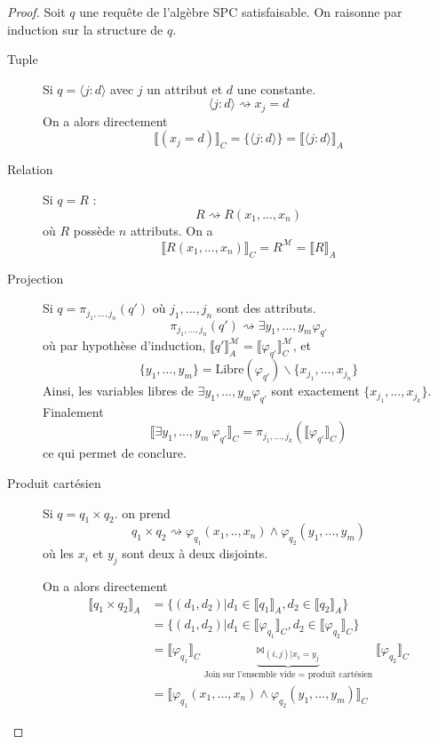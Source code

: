 \begin{proof}
Soit $q$ une requête de l'algèbre SPC satisfaisable. On raisonne par induction sur la structure de $q$.

\begin{description}
\item[Tuple] Si $q=\langle j : d\rangle$ avec $j$ un attribut et $d$ une constante.
$$
\langle j : d \rangle \rightsquigarrow x_j = d
$$
On a alors directement 
$$
\llbracket (x_j=d)\rrbracket_C = \{\langle j : d\rangle \} = \llbracket \langle j : d\rangle \rrbracket_A 
$$

\item[Relation] Si $q=R$ :
$$
R \rightsquigarrow R(x_1,...,x_n)
$$
où $R$ possède $n$ attributs. On a
$$
\llbracket R(x_1,...,x_n) \rrbracket_C =R^\mathcal{M} = \llbracket R \rrbracket_A
$$

\item[Projection] Si $q=\pi_{j_1,...,j_n}(q')$ où $j_1,...,j_n$ sont des attributs.
$$
\pi_{j_1,...,j_n}(q') \rightsquigarrow \exists y_1,...,y_m \varphi_{q'}
$$
où par hypothèse d'induction, $\llbracket q' \rrbracket^{\mathcal{M}}_A = \llbracket \varphi_{q'} \rrbracket^{\mathcal{M}}_C$, et 
$$
\{y_1,...,y_m\} = \text{Libre}(\varphi_{q'}) \backslash \{x_{j_1},...,x_{j_n}\}
$$
Ainsi, les variables libres de $\exists y_1,...,y_m \varphi_{q'}$ sont exactement $\{x_{j_1},...,x_{j_k}\}$. Finalement 
$$
\llbracket \exists y_1,...,y_m ~ \varphi_{q'} \rrbracket_C = \pi_{j_1,...,j_k}(\llbracket \varphi_{q'} \rrbracket_C)
$$
ce qui permet de conclure.

\item[Produit cartésien] Si $q=q_1 \times q_2$. on prend 
$$
q_1 \times q_2 \rightsquigarrow \varphi_{q_1}(x_1,..,x_n) \wedge \varphi_{q_2}(y_1,...,y_m)
$$
où les $x_i$ et $y_j$ sont deux à deux disjoints.

On a alors directement 
\begin{align*}
\llbracket q_1 \times q_2 \rrbracket_A &= \{ (d_1,d_2) | d_1\in \llbracket q_1 \rrbracket_A, d_2\in \llbracket q_2 \rrbracket_A \}\\
&= \{ (d_1,d_2) | d_1\in \llbracket \varphi_{q_1} \rrbracket_C, d_2\in \llbracket \varphi_{q_2} \rrbracket_C \}\\
&= \llbracket \varphi_{q_1} \rrbracket_C \underbrace{\Join_{(i,j) |x_i=y_j}}_{\text{Join sur l'ensemble vide = produit cartésien}}\llbracket \varphi_{q_2} \rrbracket_C \\
&= \llbracket \varphi_{q_1}(x_1,...,x_n) \wedge \varphi_{q_2}(y_1,...,y_m) \rrbracket_C
\end{align*}


\end{description}
\end{proof}
